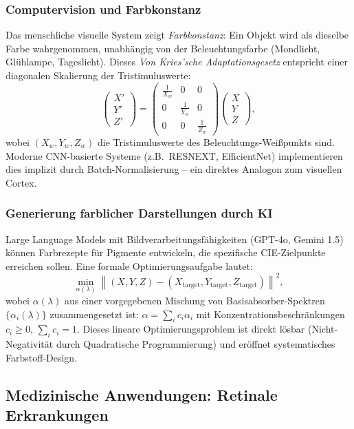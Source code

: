 ﻿\documentclass[a4paper,12pt]{article}
\theoremstyle{definition}
\begin{document}
\subsubsection{Computervision und Farbkonstanz}

Das menschliche visuelle System zeigt \emph{Farbkonstanz}: Ein Objekt wird als
dieselbe Farbe wahrgenommen, unabhängig von der Beleuchtungsfarbe (Mondlicht,
Glühlampe, Tageslicht). Dieses \emph{Von Kries'sche Adaptationsgesetz} entspricht
einer diagonalen Skalierung der Tristimuluswerte:
\[
  \begin{pmatrix}X'\\Y'\\Z'\end{pmatrix} = \begin{pmatrix}\frac{1}{X_w} & 0 & 0 \\ 0 & \frac{1}{Y_w} & 0 \\ 0 & 0 & \frac{1}{Z_w}\end{pmatrix} \begin{pmatrix}X\\Y\\Z\end{pmatrix},
\]
wobei $(X_w, Y_w, Z_w)$ die Tristimuluswerte des Beleuchtungs-Weißpunkts sind.
Moderne CNN-basierte Systeme (z.B.\ RESNEXT, EfficientNet) implementieren dies
implizit durch Batch-Normalisierung -- ein direktes Analogon zum visuellen Cortex.

\subsubsection{Generierung farblicher Darstellungen durch KI}

Large Language Models mit Bildverarbeitungsfähigkeiten (GPT-4o, Gemini 1.5)
können Farbrezepte für Pigmente entwickeln, die spezifische CIE-Zielpunkte
erreichen sollen. Eine formale Optimierungsaufgabe lautet:
\[
  \min_{\alpha(\lambda)} \left\| (X, Y, Z) - (X_{\mathrm{target}}, Y_{\mathrm{target}}, Z_{\mathrm{target}}) \right\|^2,
\]
wobei $\alpha(\lambda)$ aus einer vorgegebenen Mischung von Basisabsorber-Spektren
$\{\alpha_i(\lambda)\}$ zusammengesetzt ist: $\alpha = \sum_i c_i \alpha_i$
mit Konzentrationsbeschränkungen $c_i \ge 0$, $\sum_i c_i = 1$.
Dieses lineare Optimierungsproblem ist direkt lösbar (Nicht-Negativität durch
Quadratische Programmierung) und eröffnet systematisches Farbstoff-Design.

\subsection{Medizinische Anwendungen: Retinale Erkrankungen}
\end{document}
